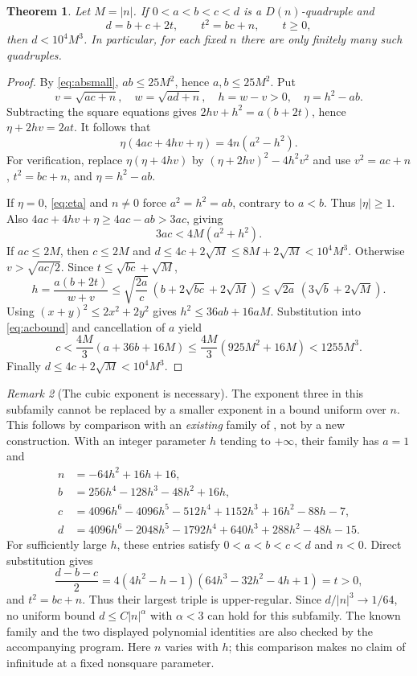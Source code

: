\documentclass[11pt,a4paper]{article}
\numberwithin{equation}{section}
\newtheorem{theorem}{Theorem}[section]
\theoremstyle{remark}
\newtheorem{remark}[theorem]{Remark}
\begin{document}
\begin{theorem}\label{thm:height}
Let $M=|n|$. If $0<a<b<c<d$ is a $D(n)$-quadruple and
\[
d=b+c+2t,\qquad t^2=bc+n,\qquad t\ge0,
\]
then $d<10^4M^3$. In particular, for each fixed $n$ there are only finitely many such quadruples.
\end{theorem}
\begin{proof}
By \eqref{eq:absmall}, $ab\le25M^2$, hence $a,b\le25M^2$. Put
\[
v=\sqrt{ac+n},\quad w=\sqrt{ad+n},\quad h=w-v>0,\quad\eta=h^2-ab.
\]
Subtracting the square equations gives $2hv+h^2=a(b+2t)$, hence $\eta+2hv=2at$. It follows that
\begin{equation}\label{eq:eta}
\eta(4ac+4hv+\eta)=4n(a^2-h^2).
\end{equation}
For verification, replace $\eta(\eta+4hv)$ by $(\eta+2hv)^2-4h^2v^2$ and use $v^2=ac+n$, $t^2=bc+n$, and $\eta=h^2-ab$.

If $\eta=0$, \eqref{eq:eta} and $n\ne0$ force $a^2=h^2=ab$, contrary to $a<b$. Thus $|\eta|\ge1$. Also $4ac+4hv+\eta\ge4ac-ab>3ac$, giving
\begin{equation}\label{eq:acbound}
3ac<4M(a^2+h^2).
\end{equation}
If $ac\le2M$, then $c\le2M$ and $d\le4c+2\sqrt M\le8M+2\sqrt M<10^4M^3$.
Otherwise $v>\sqrt{ac/2}$. Since $t\le\sqrt{bc}+\sqrt M$,
\[
h=\frac{a(b+2t)}{w+v}
\le\sqrt{\frac{2a}{c}}\,(b+2\sqrt{bc}+2\sqrt M)
\le\sqrt{2a}\,(3\sqrt b+2\sqrt M).
\]
Using $(x+y)^2\le2x^2+2y^2$ gives $h^2\le36ab+16aM$. Substitution into \eqref{eq:acbound} and cancellation of $a$ yield
\[
c<\frac{4M}{3}(a+36b+16M)
\le\frac{4M}{3}(925M^2+16M)<1255M^3.
\]
Finally $d\le4c+2\sqrt M<10^4M^3$.
\end{proof}

\begin{remark}[The cubic exponent is necessary]\label{rem:sharpness}
The exponent three in this subfamily cannot be replaced by a smaller exponent in a bound uniform over $n$. This follows by comparison with an \emph{existing} family of \citet[Section 2]{DP2019}, not by a new construction. With an integer parameter $h$ tending to $+\infty$, their family has $a=1$ and
\begin{align*}
n&=-64h^2+16h+16,\\
b&=256h^4-128h^3-48h^2+16h,\\
c&=4096h^6-4096h^5-512h^4+1152h^3+16h^2-88h-7,\\
d&=4096h^6-2048h^5-1792h^4+640h^3+288h^2-48h-15.
\end{align*}
For sufficiently large $h$, these entries satisfy $0<a<b<c<d$ and $n<0$. Direct substitution gives
\[
\frac{d-b-c}{2}=4(4h^2-h-1)(64h^3-32h^2-4h+1)=t>0,
\]
and $t^2=bc+n$.
Thus their largest triple is upper-regular. Since $d/|n|^3\to1/64$, no uniform bound $d\le C|n|^\alpha$ with $\alpha<3$ can hold for this subfamily. The known family and the two displayed polynomial identities are also checked by the accompanying program. Here $n$ varies with $h$; this comparison makes no claim of infinitude at a fixed nonsquare parameter.
\end{remark}
\end{document}
